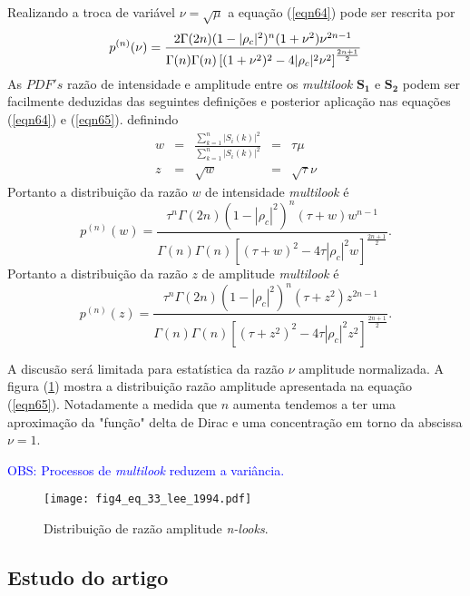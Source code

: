 Realizando a troca de variável $\nu=\sqrt{\mu}$ a equação (\ref{eqn64}) pode ser rescrita por
\begin{equation}\label{eqn65}
	p^{(n)}(\nu)=\frac{2\Gamma(2n)(1-|\rho_c|^2)^{n}(1+\nu^2)\nu^{2n-1}}{\Gamma(n)\Gamma(n)\left[(1+\nu^2)^2-4|\rho_c|^2\nu^2 \right]^{\frac{2n+1}{2}}}\\
\end{equation}
As $PDF's$ razão de intensidade e amplitude entre os {\it multilook} $\mathbf{S_1}$ e $\mathbf{S_2}$ podem ser facilmente deduzidas das seguintes definições e posterior aplicação nas equações (\ref{eqn64}) e (\ref{eqn65}). definindo 
\begin{equation}\label{eqn66}
\begin{array}{ccccc}
	w&=&\frac{\sum_{k=1}^{n}|S_i(k)|^2}{\sum_{k=1}^{n}|S_i(k)|^2}&=&\tau\mu\\
	z&=&\sqrt{w}&=&\sqrt{\tau}\nu
\end{array}
\end{equation}
Portanto a distribuição da razão $w$ de intensidade {\it multilook} é
\begin{equation}\label{eqn67}
	p^{(n)}(w)=\frac{\tau^{n}\Gamma(2n)(1-|\rho_c|^2)^{n}(\tau+w)w^{n-1}}{\Gamma(n)\Gamma(n)\left[(\tau+w)^2-4\tau|\rho_c|^2w \right]^{\frac{2n+1}{2}}}.
\end{equation}
Portanto a distribuição da razão $z$ de amplitude {\it multilook} é
\begin{equation}\label{eqn68}
	p^{(n)}(z)=\frac{\tau^{n}\Gamma(2n)(1-|\rho_c|^2)^{n}(\tau+z^2)z^{2n-1}}{\Gamma(n)\Gamma(n)\left[(\tau+z^2)^2-4\tau|\rho_c|^2z^2 \right]^{\frac{2n+1}{2}}}.
\end{equation}

A discusão será limitada para estatística da razão $\nu$ amplitude normalizada. A figura (\ref{fig2}) mostra a distribuição razão amplitude apresentada na equação  (\ref{eqn65}). Notadamente a medida que $n$ aumenta tendemos a ter uma aproximação da "função" delta de Dirac e uma concentração em torno da abscissa $\nu=1$.

\textcolor{blue}{OBS: Processos de {\it multilook} reduzem a variância.}

\begin{figure}[hbt]
\centering
\texttt{[image: fig4\_eq\_33\_lee\_1994.pdf]}
	\caption{Distribuição de razão amplitude {\it n-looks}.}
\label{fig2}
\end{figure}


\subsection{Estudo do artigo  \cite{good}}


